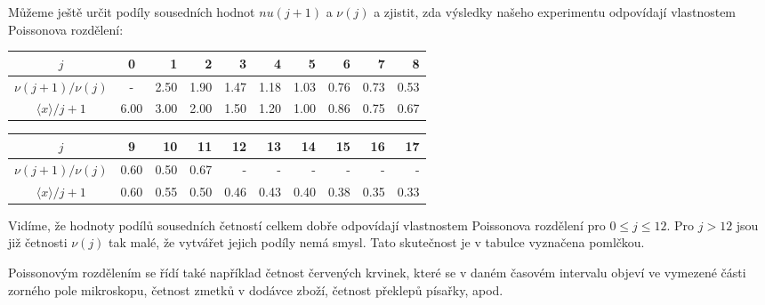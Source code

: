 \begin{example}
  Můžeme ještě určit podíly sousedních hodnot \(nu(j + 1)\) a \(\nu(j)\) a zjistit, zda výsledky 
  našeho experimentu odpovídají vlastnostem Poissonova rozdělení:
  \begin{table}[ht!]
    \centering
    \begin{tabular}{c|crrrrrrrr}
      \(j\)               & 0 & 1 & 2  & 3  & 4  & 5  & 6  & 7 & 8    \\ \hline
      \(\nu(j+1)/\nu(j)\) & - & \num{2.50} & \num{1.90} & \num{1.47} & \num{1.18} 
                          & \num{1.03} & \num{0.76} & \num{0.73} & \num{0.53}   \\
      \(\langle x \rangle / j + 1\) & \num{6.00} & \num{3.00} & \num{2.00} & \num{1.50} & \num{1.20}
                          & \num{1.00} & \num{0.86} & \num{0.75} & \num{0.67}
                 
    \end{tabular}
  \end{table}
  \begin{table}[ht!]
    \centering
    \begin{tabular}{c|crrrrrrrr}
      \(j\)               & 9 & 10 & 11  & 12  & 13  & 14  & 15  & 16 & 17    \\ \hline
      \(\nu(j+1)/\nu(j)\) & \num{0.60} & \num{0.50} & \num{0.67} & - & - & - & - & - & -   \\
      \(\langle x \rangle / j + 1\) & \num{0.60} & \num{0.55} & \num{0.50} & \num{0.46}
                          & \num{0.43} & \num{0.40} & \num{0.38} & \num{0.35} & \num{0.33}
                 
    \end{tabular}
  \end{table}
  Vidíme, že hodnoty podílů sousedních četností celkem dobře odpovídají vlastnostem Poissonova 
  rozdělení pro \(0 \leq j \leq 12\). Pro \(j > 12\) jsou již četnosti \(\nu(j)\) tak malé, že 
  vytvářet jejich podíly nemá smysl. Tato skutečnost je v tabulce vyznačena pomlčkou.
  
  Poissonovým rozdělením se řídí také například četnost červených krvinek, které se v daném časovém 
  intervalu objeví ve vymezené části zorného pole mikroskopu, četnost zmetků v dodávce zboží, 
  četnost překlepů písařky, apod.  
\normalsize
\end{example}